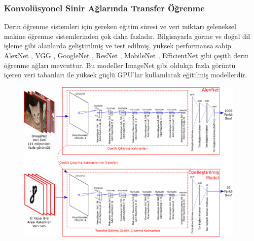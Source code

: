 \subsubsection{Konvolüsyonel Sinir Ağlarında Transfer Öğrenme}
Derin öğrenme sistemleri için gereken eğitim süresi ve veri miktarı geleneksel makine öğrenme sistemlerinden çok daha fazladır. Bilgisayarla görme ve doğal dil işleme gibi alanlarda geliştirilmiş ve test edilmiş, yüksek performansa sahip AlexNet \cite{krizhevsky2012imagenet}, VGG \cite{simonyan2014very}, GoogleNet \cite{szegedy2015going}, ResNet \cite{he2016deep}, MobileNet \cite{howard2017mobilenets}, EfficientNet \cite{tan2019efficientnet} gibi çeşitli derin öğrenme ağları mevcuttur. Bu modeller ImageNet \cite{deng2009imagenet} gibi oldukça fazla görüntü içeren veri tabanları ile yüksek güçlü GPU'lar kullanılarak eğitilmiş modellerdir.

\begin{figure}[h!]
	\begin{center}
		\vspace{0.4cm}
		{
			\vspace{0.4cm}
			\includegraphics[scale=0.37]{Yapilan-Calismalar/Figures/transfer_learning.pdf}
		}
	\end{center}
\end{figure}

